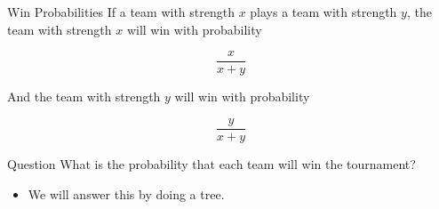 \documentclass[
  ignorenonframetext,
]{beamer}
\providecommand{\tightlist}{%
  \setlength{\itemsep}{0pt}\setlength{\parskip}{0pt}}
\begin{document}
\begin{frame}{Win Probabilities}
\protect\hypertarget{win-probabilities}{}
If a team with strength \(x\) plays a team with strength \(y\), the team
with strength \(x\) will win with probability

\[
\frac{x}{x+ y}
\]

\bigskip

And the team with strength \(y\) will win with probability

\[
\frac{y}{x + y}
\]
\end{frame}

\begin{frame}{Question}
\protect\hypertarget{question}{}
What is the probability that each team will win the tournament?

\begin{itemize}[<+->]
\tightlist
\item
  We will answer this by doing a tree.
\end{itemize}
\end{frame}
\end{document}
